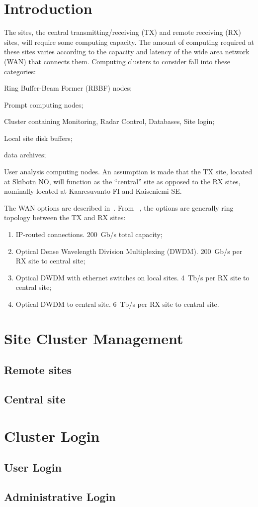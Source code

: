 \documentclass[12pt,a4paper]{article}
\begin{document}
\section{Introduction}
\label{intro}

The \ED sites, the central transmitting/receiving (TX) and remote receiving (RX) sites, will require some computing capacity.
The amount of computing required at these sites varies according to the capacity and latency of the wide area network (WAN)
that connects them.
Computing clusters to consider fall into these categories:
\bitm
\item Ring Buffer-Beam Former (RBBF) nodes;
\item Prompt computing nodes;
\item Cluster containing Monitoring, Radar Control, Databases, Site login;
\item Local site disk buffers;
\item \ED data archives;
\item User analysis computing nodes.
  \eitm
An assumption is made that the TX site, located at Skibotn NO, will function as the ``central'' site as opposed to the RX sites, nominally located at Kaaresuvanto FI and Kaiseniemi SE.
  
The WAN options are described in~\cite{wan-options}.
From ~\cite{wan-options}, the options are generally ring topology between the TX and RX sites:
\begin{enumerate}
\item IP-routed connections. 200~Gb/s total capacity;
\item Optical Dense Wavelength Division Multiplexing (DWDM). 200~Gb/s per RX site to central site;
\item Optical DWDM with ethernet switches on local sites. 4~Tb/s per RX site to central site;
\item Optical DWDM to central site. 6~Tb/s per RX site to central site.
\end{enumerate}

\section{Site Cluster Management}

\subsection{Remote sites}

\subsection{Central site}

\section{Cluster Login}


\subsection{User Login}

\subsection{Administrative Login}


\newpage
{}

\end{document}
